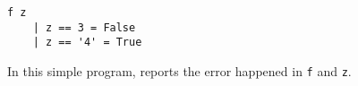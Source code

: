 


\begin{listing}
\begin{verbatim}
f z     
    | z == 3 = False
    | z == '4' = True
\end{verbatim}
\caption{In this simple program, \chameleon{} reports the error happened in \texttt{f} and \texttt{z}.}
\label{listing:2}
\end{listing}





